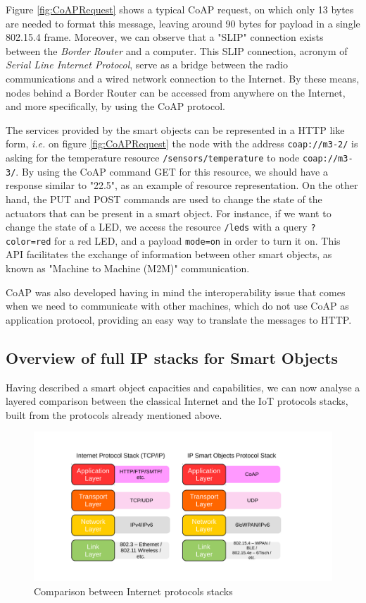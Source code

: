 Figure \ref{fig:CoAPRequest} shows a typical CoAP request, on which only 13 bytes are needed to format this message, leaving around 90 bytes for payload in a single 802.15.4 frame.
Moreover, we can observe that a "SLIP" connection exists between the \textit{Border Router} and a computer.
This SLIP connection, acronym of \textit{Serial Line Internet Protocol}, serve as a bridge between the radio communications and a wired network connection to the Internet.
By these means, nodes behind a Border Router can be accessed from anywhere on the Internet, and more specifically, by using the CoAP protocol.

The services provided by the smart objects can be represented in a HTTP like form, \textit{i.e.} on figure \ref{fig:CoAPRequest} the node with the address \texttt{coap://m3-2/} is asking for the temperature resource \texttt{/sensors/temperature} to node \texttt{coap://m3-3/}. 
By using the CoAP command GET for this resource, we should have a response similar to "22.5", as an example of resource representation.
On the other hand, the PUT and POST commands are used to change the state of the actuators that can be present in a smart object.
For instance, if we want to change the state of a LED, we access the resource \texttt{/leds} with a query \texttt{?color=red} for a red LED, and a payload \texttt{mode=on} in order to turn it on.
This API facilitates the exchange of information between other smart objects, as known as "Machine to Machine (M2M)" communication.

CoAP was also developed having in mind the interoperability issue that comes when we need to communicate with other machines, which do not use CoAP as application protocol, providing an easy way to translate the messages to HTTP.

\subsection{Overview of full IP stacks for Smart Objects}
Having described a smart object capacities and capabilities, we can now analyse a layered comparison between the classical Internet and the IoT protocols stacks, built from the protocols already mentioned above.

\begin{figure}[htb]
	\centering
	\includegraphics[width=1\columnwidth]{chapters/background.images/Layers.pdf}
	\caption{Comparison between Internet protocols stacks}
	\label{fig:IPLayers}
\end{figure}

